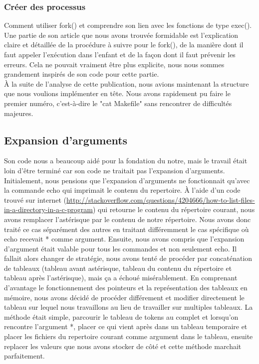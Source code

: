 \documentclass{article}
\begin{document}
\subsubsection{Créer des processus} 
Comment utiliser fork() et comprendre son lien avec les fonctions de type exec(). Une partie de son article que nous avons trouvée formidable est l’explication claire et détaillée de la procédure à suivre pour le fork(), de la manière dont il faut appeler l’exécution dans l’enfant et de la façon dont il faut prévenir les erreurs. Cela ne pouvait vraiment être plus explicite, nous nous sommes grandement inspirés de son code pour cette partie.
\\

À la suite de l’analyse de cette publication, nous avions maintenant la structure que nous voulions implémenter en tête. Nous avons rapidement pu faire le premier numéro, c’est-à-dire le "cat Makefile" sans rencontrer de difficultés majeures. 

\subsection{Expansion d'arguments}
Son code nous a beaucoup aidé pour la fondation du notre, mais le travail était loin d'être terminé car son code ne traitait pas l'expansion d'arguments. Initialement, nous pensions que l'expansion d'arguments ne fonctionnait qu'avec la commande echo qui imprimait le contenu du repertoire. À l'aide d'un code trouvé sur internet (\url{http://stackoverflow.com/questions/4204666/how-to-list-files-in-a-directory-in-a-c-program}) qui retourne le contenu du répertoire courant, nous avons remplacer l'astérisque par le contenu de notre répertoire. Nous avons donc traité ce cas séparément des autres en traitant différemment le cas spécifique où echo recevait * comme argument. Ensuite, nous avons compris que l'expansion d'argument était valable pour tous les commandes et non seulement echo. Il fallait alors changer de stratégie, nous avons tenté de procéder par concaténation de tableaux (tableau avant astérisque, tableau du contenu du répertoire et tableau après l'astérisque), mais ça a échoué misérablement. En comprenant d'avantage le fonctionnement des pointeurs et la représentation des tableaux en mémoire, nous avons décidé de procéder différement et modifier directement le tableau sur lequel nous travaillons au lieu de travailler sur multiples tableaux. La méthode était simple, parcourir le tableau de tokens au complet et lorsqu'on rencontre l'argument *, placer ce qui vient après dans un tableau temporaire et placer les fichiers du repertoire courant comme argument dans le tableau, ensuite replacer les valeurs que nous avons stocker de côté et cette méthode marchait parfaitement.
\end{document}
